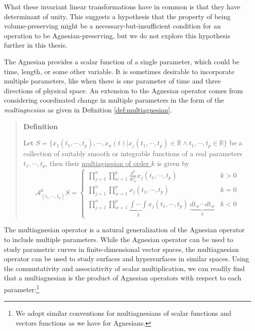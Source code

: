 \documentclass[
  letterpaper,
  DIV=11,
  numbers=noendperiod]{scrreprt}
\begin{document}
What these invariant linear transformations have in common is that they
have determinant of unity. This suggests a hypothesis that the property
of being volume-preserving might be a necessary-but-insufficient
condition for an operation to be Agnesian-preserving, but we do not
explore this hypothesis further in this thesis.

The Agnesian provides a scalar function of a single parameter, which
could be time, length, or some other variable. It is sometimes desirable
to incorporate multiple parameters, like when there is one parameter of
time and three directions of physical space. An extension to the
Agnesian operator comes from considering coordinated change in multiple
parameters in the form of the \emph{multiagnesian} as given in
Definition \ref{def:multiagnesian}.

\begin{quote}
\textbf{Definition}

Let
\(S = \{x_1(t_1, \cdots, t_p),  \cdots, x_n(t) | x_j(t_1, \cdots, t_p) \in \mathbb{R} \land t_1, \cdots, t_p \in \mathbb{R} \}\)
be a collection of suitably smooth or integrable functions of a real
parameters \(t_1, \cdots, t_p\), then their
\underline{multiagnesian of order $k$} is given by \begin{equation*}
\mathcal{A}_{(t_1, \cdots, t_p)}^{k} S = \begin{cases} \prod_{j=1}^{n} \prod_{w=1}^{p} \frac{d^k}{dt_{w}^k}x_j(t_1, \cdots, t_p) & k > 0 \\ \prod_{j=1}^{n} \prod_{w=1}^{p} x_j (t_1, \cdots, t_p) & k = 0 \\ \prod_{j=1}^{n} \prod_{w=1}^{p} \underbrace{\int \cdots \int}_k x_j(t_1, \cdots, t_p)\ \underbrace{dt_{w}  \cdots dt_{w}}_k & k < 0 \end{cases}
\end{equation*}
\end{quote}

The multiagnesian operator is a natural generalization of the Agnesian
operator to include multiple parameters. While the Agnesian operator can
be used to study parametric curves in finite-dimensional vector spaces,
the multiagnesian operator can be used to study surfaces and
hypersurfaces in similar spaces. Using the commutativity and
associativity of scalar multiplication, we can readily find that a
multiagnesian is the product of Agnesian operators with respect to each
parameter:\footnote{We adopt similar conventions for multiagnesians of scalar functions and vectors functions as we have for Agnesians.}
\end{document}
